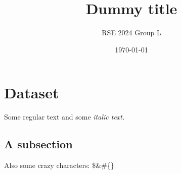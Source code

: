 \documentclass{article}%
\title{Dummy title}%
\author{RSE 2024 Group L}%
\date{\today}%
\begin{document}
%
\normalsize%
\maketitle%
\section{Dataset}%
\label{sec:Dataset}%
Some regular text and some %
\textit{italic text. }%
\subsection{A subsection}%
\label{subsec:Asubsection}%
Also some crazy characters: \$\&\#\{\}

%
\end{document}
